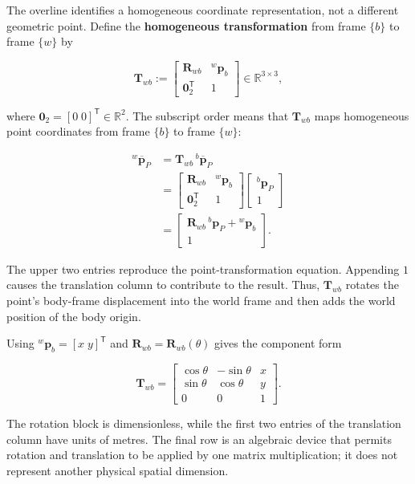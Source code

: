 \documentclass[
  australian,
  12pt,
  letterpaper,
  DIV=11,
  numbers=noendperiod,
  twoside]{scrreprt}
\begin{document}
The overline identifies a homogeneous coordinate representation, not a
different geometric point. Define the \textbf{homogeneous
transformation} from frame \(\{b\}\) to frame \(\{w\}\) by

\[
\boxed{
\mathbf T_{wb}
\mathrel{:=}
\begin{bmatrix}
\mathbf R_{wb}&{}^{w}\mathbf p_b\\
\mathbf 0_2^\mathsf T&1
\end{bmatrix}
}
\in\mathbb R^{3\times3},
\]

where \(\mathbf 0_2=[0\;0]^\mathsf T\in\mathbb R^2\). The subscript
order means that \(\mathbf T_{wb}\) maps homogeneous point coordinates
from frame \(\{b\}\) to frame \(\{w\}\):

\[
\begin{aligned}
{}^{w}\overline{\mathbf p}_P
&=
\mathbf T_{wb}\,{}^{b}\overline{\mathbf p}_P\\
&=
\begin{bmatrix}
\mathbf R_{wb}&{}^{w}\mathbf p_b\\
\mathbf 0_2^\mathsf T&1
\end{bmatrix}
\begin{bmatrix}
{}^{b}\mathbf p_P\\
1
\end{bmatrix}\\
&=
\begin{bmatrix}
\mathbf R_{wb}\,{}^{b}\mathbf p_P+{}^{w}\mathbf p_b\\
1
\end{bmatrix}.
\end{aligned}
\]

The upper two entries reproduce the point-transformation equation.
Appending \(1\) causes the translation column to contribute to the
result. Thus, \(\mathbf T_{wb}\) rotates the point's body-frame
displacement into the world frame and then adds the world position of
the body origin.

Using \({}^{w}\mathbf p_b=[x\;y]^\mathsf T\) and
\(\mathbf R_{wb}=\mathbf R_{wb}(\theta)\) gives the component form

\[
\mathbf T_{wb}
=
\begin{bmatrix}
\cos\theta&-\sin\theta&x\\
\sin\theta&\cos\theta&y\\
0&0&1
\end{bmatrix}.
\]

The rotation block is dimensionless, while the first two entries of the
translation column have units of metres. The final row is an algebraic
device that permits rotation and translation to be applied by one matrix
multiplication; it does not represent another physical spatial
dimension.
\end{document}
